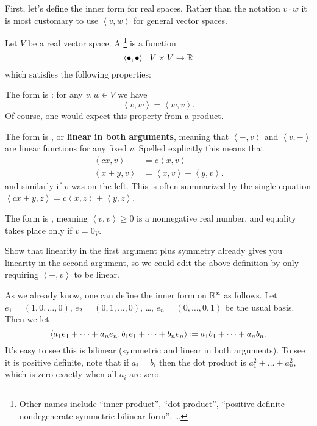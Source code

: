 First, let's define the inner form for real spaces.
Rather than the notation $v \cdot w$ it is most customary
to use $\left< v,w \right>$ for general vector spaces.
\begin{definition}
	Let $V$ be a real vector space.
	A \footnote{Other
		names include ``inner product'', ``dot product'',
		``positive definite nondegenerate symmetric bilinear form'', \dots}
	is a function
	\[ \left< \bullet, \bullet \right> : V \times V \to \mathbb R \]
	which satisfies the following properties:
	\begin{itemize}
		\ii The form is : for any $v,w \in V$ we have
		\[ \left< v,w \right> = \left< w,v\right>. \]
		Of course, one would expect this property from a product.

		\ii The form is , or \textbf{linear in both arguments},
		meaning that $\left< -, v\right>$
		and $\left< v, -\right>$ are linear functions for any fixed $v$.
		Spelled explicitly this means that
		\begin{align*}
			\left< cx, v \right> &= c \left< x,v \right> \\
			\left< x+y, v \right> &= \left< x,v \right> + \left< y,v \right>.
		\end{align*}
		and similarly if $v$ was on the left.
		This is often summarized by the single equation
		$\left< cx+y, z \right> = c \left< x,z \right> + \left< y,z \right>$.

		\ii The form is , meaning $\left<v,v\right> \ge 0$
		is a nonnegative real number, and equality takes place only if $v = 0_V$.
	\end{itemize}
\end{definition}
\begin{exercise}
	Show that linearity in the first argument plus symmetry
	already gives you linearity in the second argument,
	so we could edit the above definition
	by only requiring $\left< -, v\right>$ to be linear.
\end{exercise}

\begin{example}
	[$\RR^n$]
	As we already know, one can define the inner form on $\RR^n$ as follows.
	Let $e_1 = (1, 0, \dots, 0)$, $e_2 = (0, 1, \dots, 0)$,
	\dots, $e_n = (0, \dots, 0, 1)$ be the usual basis.
	Then we let
	\[
		\left< a_1 e_1 + \dots + a_n e_n, b_1 e_1 + \dots + b_n e_n \right>
		\coloneqq a_1 b_1 + \dots + a_n b_n.
	\]
	It's easy to see this is bilinear
	(symmetric and linear in both arguments).
	To see it is positive definite,
	note that if $a_i = b_i$
	then the dot product is $a_1^2 + \dots + a_n^2$,
	which is zero exactly when all $a_i$ are zero.
\end{example}

